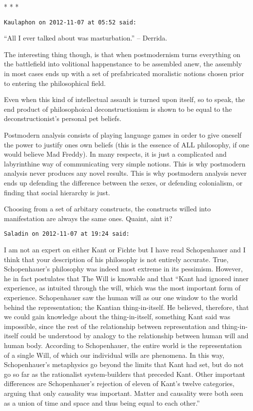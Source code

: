 \begin{center}* * *\end{center}

\begin{footnotesize}\begin{sffamily}

\texttt{Kaulaphon on 2012-11-07 at 05:52 said: }

“All I ever talked about was masturbation.” – Derrida. 

The interesting thing though, is that when postmodernism turns everything on the battlefield into volitional
happenstance to be assembled anew, the assembly in most cases ends up with a set of prefabricated moralistic notions
chosen prior to entering the philosophical field. 

Even when this kind of intellectual assault is turned upon itself, so to speak, the end product of philosophoical
deconstructionism is shown to be equal to the deconstructionist's personal pet beliefs. 

Postmodern analysis consists of playing language games in order to give oneself the power to justify ones own beliefs
(this is the essence of ALL philosophy, if one would believe Mad Freddy). In many respects, it is just a complicated
and labyrinthine way of communicating very simple notions. This is why postmodern analysis never produces any novel
results. This is why postmodern analysis never ends up defending the difference between the sexes, or defending
colonialism, or finding that social hierarchy is just. 

Choosing from a set of arbitary constructs, the constructs willed into manifestation are always the same ones. Quaint,
aint it?

\hfill

\texttt{Saladin on 2012-11-07 at 19:24 said: }

I am not an expert on either Kant or Fichte but I have read Schopenhauer and I think that your description of his
philosophy is not entirely accurate. True, Schopenhauer's philosophy was indeed most extreme in its
pessimism. However, he in fact postulates that The Will is knowable and that “Kant had ignored inner experience, as
intuited through the will, which was the most important form of experience. Schopenhauer saw the human will as our one
window to the world behind the representation; the Kantian thing-in-itself. He believed, therefore, that we could gain
knowledge about the thing-in-itself, something Kant said was impossible, since the rest of the relationship between
representation and thing-in-itself could be understood by analogy to the relationship between human will and human
body. According to Schopenhauer, the entire world is the representation of a single Will, of which our individual wills
are phenomena. In this way, Schopenhauer's metaphysics go beyond the limits that Kant had set, but do not
go so far as the rationalist system-builders that preceded Kant. Other important differences are
Schopenhauer's rejection of eleven of Kant's twelve categories, arguing that only causality was
important. Matter and causality were both seen as a union of time and space and thus being equal to each other.”


\end{sffamily}
\end{footnotesize}
